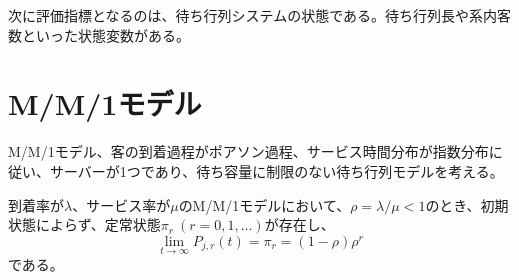 次に評価指標となるのは、待ち行列システムの状態である。待ち行列長や系内客数といった状態変数がある。



\section{M/M/1モデル}
M/M/1モデル、客の到着過程がポアソン過程、サービス時間分布が指数分布に従い、サーバーが1つであり、待ち容量に制限のない待ち行列モデルを考える。

\begin{theorem}[M/M/1モデルにおける定常状態の存在]
    到着率が$\lambda$、サービス率が$\mu$のM/M/1モデルにおいて、$\rho=\lambda/\mu < 1$のとき、初期状態によらず、定常状態$\pi_r\ (r=0,1,\ldots)$が存在し、
    \begin{equation}
        \lim_{t\to\infty}P_{j,r}(t)=\pi_r = (1-\rho)\rho^r
    \end{equation}
    である。
\end{theorem}


